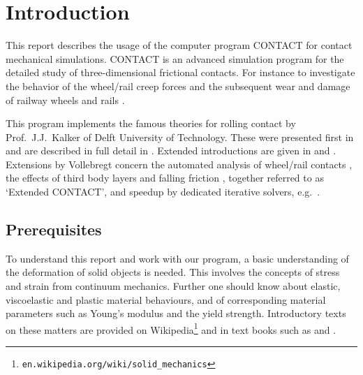 \documentclass[12pt]{report}
\begin{document}

\clearpage


\chapter{Introduction}
\label{chp:introduction}

This report describes the usage of the computer program CONTACT for contact
mechanical simulations. CONTACT is an advanced simulation program for the
detailed study of three-dimensional frictional contacts. For instance to
investigate the behavior of the wheel/rail creep forces and the subsequent
wear and damage of railway wheels and rails \cite{Meymand2016a-review,
Vollebregt2021a-soa-paper}.

This program implements the famous theories for rolling contact by Prof.\
J.J.\ Kalker of Delft University of Technology. These were presented first
in \cite{Kalker1979a} and are described in full detail in
\cite{Kalker1990}. Extended introductions are given in \cite{Kalker2000}
and \cite{Vollebregt2011a-assessm}. Extensions by Vollebregt concern the
automated analysis of wheel/rail contacts \cite{Vollebregt2020b-wrgeom,
Vollebregt2020c-distr-force,Vollebregt2022b-cm2022,
Vollebregt2023a-iavsd2023}, the effects of third
body layers \cite{Vollebregt2014c-tractcurv,Vollebregt2019a-fra} and
falling friction \cite{Vollebregt2012a-quasistd}, together referred to as
`Extended CONTACT', and speedup by dedicated iterative solvers, e.g.\
\cite{Vollebregt2014a-fftprec,Zhao_Jing2015a-tangcg}.

\section{Prerequisites}

To understand this report and work with our program, a basic understanding
of the deformation of solid objects is needed. This involves the concepts
of stress and strain from continuum mechanics. Further one should know
about elastic, viscoelastic and plastic material behaviours, and of
corresponding material parameters such as Young's modulus and the yield
strength. Introductory texts on these matters are provided on
Wikipedia\footnote{{\tt en.wikipedia.org/wiki/solid\_mechanics}} and in
text books such as \cite{Bower2008} and \cite{Naghdi2001}.
\end{document}
